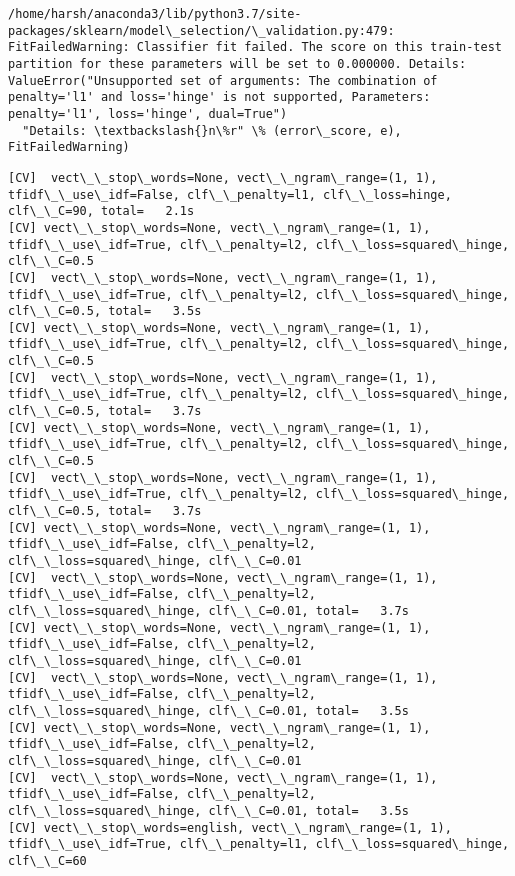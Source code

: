 \documentclass[11pt]{article}
\begin{document}
    \begin{Verbatim}[commandchars=\\\{\}]
/home/harsh/anaconda3/lib/python3.7/site-packages/sklearn/model\_selection/\_validation.py:479: FitFailedWarning: Classifier fit failed. The score on this train-test partition for these parameters will be set to 0.000000. Details: 
ValueError("Unsupported set of arguments: The combination of penalty='l1' and loss='hinge' is not supported, Parameters: penalty='l1', loss='hinge', dual=True")
  "Details: \textbackslash{}n\%r" \% (error\_score, e), FitFailedWarning)

    \end{Verbatim}

    \begin{Verbatim}[commandchars=\\\{\}]
[CV]  vect\_\_stop\_words=None, vect\_\_ngram\_range=(1, 1), tfidf\_\_use\_idf=False, clf\_\_penalty=l1, clf\_\_loss=hinge, clf\_\_C=90, total=   2.1s
[CV] vect\_\_stop\_words=None, vect\_\_ngram\_range=(1, 1), tfidf\_\_use\_idf=True, clf\_\_penalty=l2, clf\_\_loss=squared\_hinge, clf\_\_C=0.5 
[CV]  vect\_\_stop\_words=None, vect\_\_ngram\_range=(1, 1), tfidf\_\_use\_idf=True, clf\_\_penalty=l2, clf\_\_loss=squared\_hinge, clf\_\_C=0.5, total=   3.5s
[CV] vect\_\_stop\_words=None, vect\_\_ngram\_range=(1, 1), tfidf\_\_use\_idf=True, clf\_\_penalty=l2, clf\_\_loss=squared\_hinge, clf\_\_C=0.5 
[CV]  vect\_\_stop\_words=None, vect\_\_ngram\_range=(1, 1), tfidf\_\_use\_idf=True, clf\_\_penalty=l2, clf\_\_loss=squared\_hinge, clf\_\_C=0.5, total=   3.7s
[CV] vect\_\_stop\_words=None, vect\_\_ngram\_range=(1, 1), tfidf\_\_use\_idf=True, clf\_\_penalty=l2, clf\_\_loss=squared\_hinge, clf\_\_C=0.5 
[CV]  vect\_\_stop\_words=None, vect\_\_ngram\_range=(1, 1), tfidf\_\_use\_idf=True, clf\_\_penalty=l2, clf\_\_loss=squared\_hinge, clf\_\_C=0.5, total=   3.7s
[CV] vect\_\_stop\_words=None, vect\_\_ngram\_range=(1, 1), tfidf\_\_use\_idf=False, clf\_\_penalty=l2, clf\_\_loss=squared\_hinge, clf\_\_C=0.01 
[CV]  vect\_\_stop\_words=None, vect\_\_ngram\_range=(1, 1), tfidf\_\_use\_idf=False, clf\_\_penalty=l2, clf\_\_loss=squared\_hinge, clf\_\_C=0.01, total=   3.7s
[CV] vect\_\_stop\_words=None, vect\_\_ngram\_range=(1, 1), tfidf\_\_use\_idf=False, clf\_\_penalty=l2, clf\_\_loss=squared\_hinge, clf\_\_C=0.01 
[CV]  vect\_\_stop\_words=None, vect\_\_ngram\_range=(1, 1), tfidf\_\_use\_idf=False, clf\_\_penalty=l2, clf\_\_loss=squared\_hinge, clf\_\_C=0.01, total=   3.5s
[CV] vect\_\_stop\_words=None, vect\_\_ngram\_range=(1, 1), tfidf\_\_use\_idf=False, clf\_\_penalty=l2, clf\_\_loss=squared\_hinge, clf\_\_C=0.01 
[CV]  vect\_\_stop\_words=None, vect\_\_ngram\_range=(1, 1), tfidf\_\_use\_idf=False, clf\_\_penalty=l2, clf\_\_loss=squared\_hinge, clf\_\_C=0.01, total=   3.5s
[CV] vect\_\_stop\_words=english, vect\_\_ngram\_range=(1, 1), tfidf\_\_use\_idf=True, clf\_\_penalty=l1, clf\_\_loss=squared\_hinge, clf\_\_C=60 

    \end{Verbatim}
\end{document}
